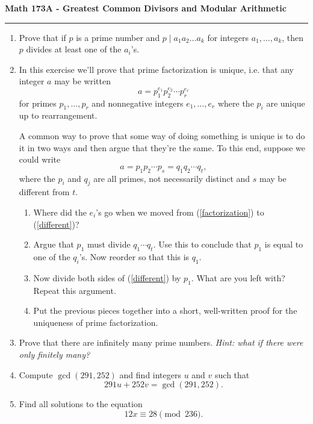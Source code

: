 \documentclass[11pt,letterpaper]{article}
\begin{document}
\begin{center}
{\bf \Large Math 173A - Greatest Common Divisors and Modular Arithmetic}
\vspace{0.2cm}
\hrule
\end{center}

\begin{enumerate}

    \item Prove that if $p$ is a prime number and $p\mid a_1a_2\ldots a_k$ for integers $a_1, \ldots, a_k$, then $p$ divides at least one of the $a_i$'s.


    \item In this exercise we'll prove that prime factorization is unique, i.e. that any integer $a$ may be written
    \begin{equation}\label{factorization}
        a = p_1^{e_1}p_2^{e_2}\cdots p_r^{e_r}
    \end{equation}
    for primes $p_1, \ldots, p_r$ and nonnegative integers $e_1, \ldots, e_r$ where the $p_i$ are unique up to rearrangement.

    A common way to prove that some way of doing something is unique is to do it in two ways and then argue that they're the same.
    To this end, suppose we could write
    \begin{equation}\label{different}
        a = p_1p_2\cdots p_s = q_1q_2\cdots q_t,
    \end{equation}
    where the $p_i$ and $q_j$ are all primes, not necessarily distinct and $s$ may be different from $t$.
    \begin{enumerate}
        \item Where did the $e_i$'s go when we moved from (\ref{factorization}) to (\ref{different})?


        \item Argue that $p_1$ must divide $q_1\cdots q_t$. Use this to conclude that $p_1$ is equal to one of the $q_i$'s. Now reorder so that this is $q_1$.

        \item Now divide both sides of (\ref{different}) by $p_1$. What are you left with? Repeat this argument.

        \item Put the previous pieces together into a short, well-written proof for the uniqueness of prime factorization.
    \end{enumerate}
    

    \item Prove that there are infinitely many prime numbers. \emph{Hint: what if there were only finitely many?}

    \item Compute $\gcd(291, 252)$ and find integers $u$ and $v$ such that
    \[
        291u + 252v = \gcd(291, 252).
    \]

    \item Find all solutions to the equation
    \[
        12x\equiv 28\pmod{236}.
    \]
\end{enumerate}
\end{document}
